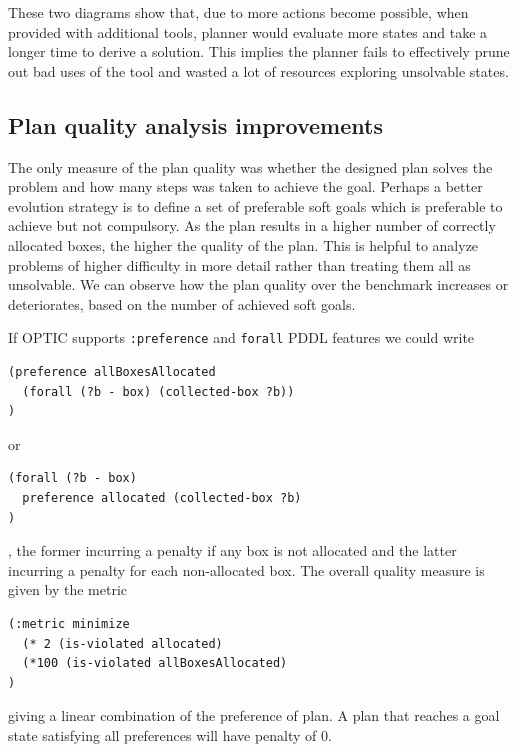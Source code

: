 \documentclass[letterpaper]{article} %
\begin{document}
These two diagrams show that, due to more actions become possible, 
when provided with additional tools, planner would evaluate more 
states and take a longer time to derive a solution. This implies 
the planner fails to effectively prune out bad uses of the tool and 
wasted a lot of resources exploring unsolvable states. 
\subsection{Plan quality analysis improvements}
The only measure of the plan quality was whether 
the designed plan solves the problem and how many 
steps was taken to achieve the goal. Perhaps a better 
evolution strategy is to define a set of preferable 
soft goals which is preferable to achieve but not 
compulsory. As the plan results in a higher number 
of correctly allocated boxes, the higher the quality 
of the plan.  This is helpful to analyze problems 
of higher difficulty in more detail rather than 
treating them all as unsolvable. We can observe 
how the plan quality over the benchmark increases 
or deteriorates, based on the number of achieved 
soft goals.  

If OPTIC supports \texttt{:preference} and \texttt{forall}
PDDL features we could write 
\begin{verbatim}
(preference allBoxesAllocated 
  (forall (?b - box) (collected-box ?b))
)  
\end{verbatim}
or 
\begin{verbatim}
(forall (?b - box) 
  preference allocated (collected-box ?b)
)
\end{verbatim}
, the former incurring a penalty if any box is
 not allocated and the latter incurring a 
 penalty for each non-allocated box. 
 The overall quality measure is given by the metric
\begin{verbatim}
(:metric minimize 
  (* 2 (is-violated allocated)
  (*100 (is-violated allBoxesAllocated)
)
\end{verbatim}
 giving a linear combination of the preference of plan. 
 A plan that reaches a goal state satisfying 
 all preferences will have penalty of 0.



\end{document}
